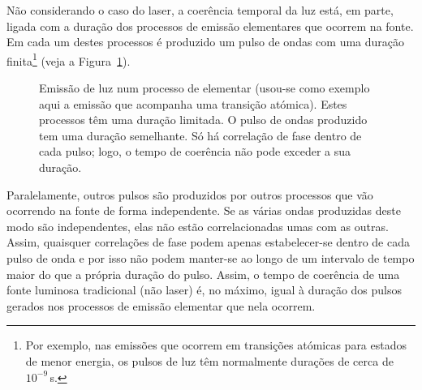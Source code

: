 Não considerando o caso do laser, a coerência temporal da luz está, em parte,
ligada com a duração dos processos de emissão elementares que ocorrem na fonte.
Em cada um destes processos é produzido um pulso de ondas com uma duração
finita\footnote{Por exemplo, nas emissões que ocorrem em transições atómicas
para estados de menor energia, os pulsos de luz têm normalmente durações de
cerca de $10^{-9}$\,s.} (veja a Figura~\ref{fig:emission}).
\begin{figure}[htb]
  {\centering
    \par
  }
  \caption{Emissão de luz num processo de elementar (usou-se como exemplo aqui a
  emissão que acompanha uma transição atómica). Estes processos têm uma duração
  limitada. O pulso de ondas produzido tem uma duração
  semelhante. Só há correlação de fase dentro de cada pulso; logo, o tempo de
  coerência não pode exceder a sua duração.\label{fig:emission}}
\end{figure}
Paralelamente, outros pulsos são produzidos por outros processos que vão
ocorrendo na fonte de forma independente. Se as várias ondas produzidas deste
modo são independentes, elas não estão correlacionadas umas com as outras.
Assim, quaisquer correlações de fase podem apenas estabelecer-se dentro de
cada pulso de onda e por isso não podem manter-se ao longo de um intervalo de
tempo maior do que a própria duração do pulso. Assim, o tempo de coerência de
uma fonte luminosa tradicional (não laser) é, no máximo, igual à duração dos
pulsos gerados nos processos de emissão elementar que nela ocorrem.

